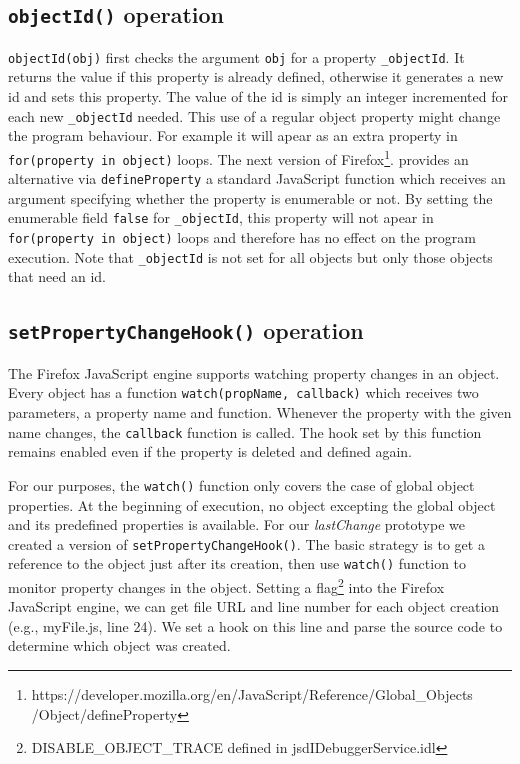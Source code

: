 \documentclass[runningheads,a4paper]{llncs}
\begin{document}
\subsection{\texttt{objectId()} operation}
\texttt{objectId(obj)} first checks the argument \texttt{obj} for a property \texttt{\_objectId}.
It returns the value if this property is already defined,
otherwise it generates a new id and sets this property. The value of the id is simply an integer incremented 
for each new \texttt{\_objectId} needed. This use of a regular object property  might change
the program behaviour. For example it will apear as an extra property in 
\texttt{for(property in object)} loops. 
The next version of Firefox\footnote[3]{https://developer.mozilla.org/en/JavaScript/Reference/Global\_Objects\\/Object/defineProperty}.
provides an alternative via \texttt{defineProperty} a standard JavaScript
function which receives 
an argument specifying whether the property is enumerable or not. By setting the enumerable
field \texttt{false} for \texttt{\_objectId}, this property will not
apear in \texttt{for(property in object)} loops and therefore has no
effect on the program execution. Note that \texttt{\_objectId} is
not set for all objects but only those objects that need an id.

\subsection{\texttt{setPropertyChangeHook()} operation}
The Firefox JavaScript engine supports watching property changes in an
object. Every object has a function \texttt{watch(propName, callback)}
which receives two parameters, a property name and function.  Whenever
the property with the given name changes, the \texttt{callback} function is
called. The hook set by this function remains enabled even if the
property is deleted and defined again. 

For our purposes, the \texttt{watch()} function only covers the case
of global object properties. At the beginning of execution, no object
excepting the global object and its predefined properties is available.  For 
our \textit{lastChange} prototype we created a version of
\texttt{setPropertyChangeHook()}.  The basic strategy is to get a reference to the object just
after its creation, then use \texttt{watch()} function to monitor
property changes in the object. Setting a flag\footnote[4]{DISABLE\_OBJECT\_TRACE defined in jsdIDebuggerService.idl} into the Firefox 
JavaScript engine, we can get file URL and line number for each object
creation (e.g., myFile.js, line 24). We set a hook on this line
and parse the source code to determine which object was created.
\end{document}
